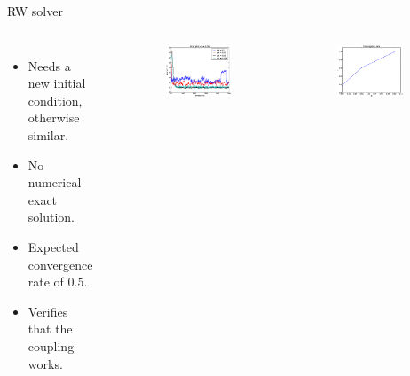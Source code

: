 \documentclass[12pt,a4paper, xcolor={usenames,dvipsnames,svgnames,table}]{beamer}
\begin{document}
\begin{frame}[shrink]{RW solver}
\begin{columns}
 \begin{itemize}
  \item <2-> Needs a new initial condition, otherwise similar.
  \item <3-> No numerical exact solution.
  \item <4-> Expected convergence rate of $0.5$.
  \item <5-> Verifies that the coupling works.
 \end{itemize}
\vspace{5pt}\\
\begin{figure}[H]
 \centering
  \includegraphics[width=0.8\textwidth]{../../results/experiment_01052014_1615_Redoing_RW_tests/results/errorplot.eps}
\end{figure}
\begin{figure}[h!]
\centering
  \includegraphics[width=0.8\textwidth]{../../results/experiment_01052014_1615_Redoing_RW_tests/results/ConvergenceTest.eps}
\end{figure}
\end{columns}

\end{frame}
\notetoself{}
\end{document}
